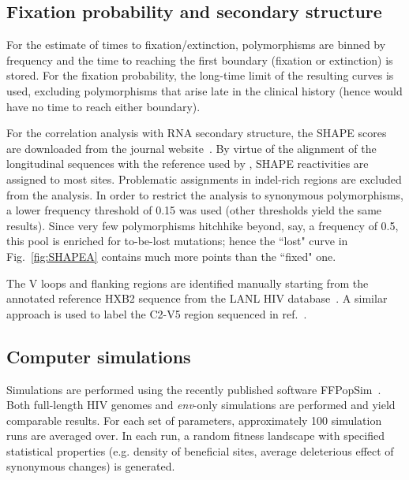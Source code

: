 \documentclass[rmp, twocolumn]{revtex4}
\newcommand{\FIG}[1]{Fig.~\ref{fig:#1}}
\newcommand{\env}{\textit{env}}
\begin{document}
\subsection{Fixation probability and secondary structure}
For the estimate of times to fixation/extinction, polymorphisms are
binned by frequency and the time to reaching the first boundary (fixation or
extinction) is stored. For the fixation probability, the long-time limit of the
resulting curves is used, excluding polymorphisms that arise late in the
clinical history (hence would have no time to reach either boundary).

For the correlation analysis with RNA secondary structure, the SHAPE scores are
downloaded from the journal website~\citep{watts_architecture_2009}. By virtue
of the alignment of the longitudinal sequences with the reference used by
\citet{watts_architecture_2009}, SHAPE reactivities are assigned to most sites.
Problematic assignments in indel-rich regions are excluded from the analysis.
In order to restrict the analysis to synonymous polymorphisms, a lower frequency
threshold of 0.15 was used (other thresholds yield the same results). Since
very few polymorphisms hitchhike beyond, say, a frequency of 0.5, this pool is
enriched for to-be-lost mutations; hence the ``lost" curve in \FIG{SHAPEA}
contains much more points than the ``fixed" one.

The V loops and flanking regions are identified manually starting from the
annotated reference HXB2 sequence from the LANL HIV database~\citep{LANL2012}. A
similar approach is used to label the C2-V5 region sequenced in
ref.~\citep{shankarappa_consistent_1999}.

\subsection{Computer simulations}
Simulations are performed using the recently published software
FFPopSim~\citep{zanini_ffpopsim:_2012}. Both full-length HIV genomes and
\env{}-only simulations are performed and yield comparable results. For each
set of parameters, approximately 100 simulation runs are averaged over. In each
run, a random fitness landscape with specified statistical properties (e.g.
density of beneficial sites, average deleterious effect of synonymous changes) is generated.
\end{document}
